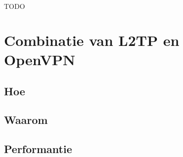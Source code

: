 TODO


\section{Combinatie van L2TP en OpenVPN}
\label{sec:combinatie}

\subsection{Hoe}

\subsection{Waarom}

\subsection{Performantie}